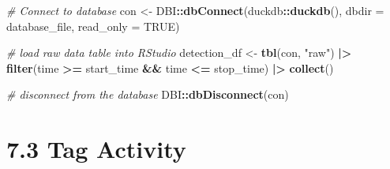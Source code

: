 \documentclass[
]{book}
\newenvironment{Shaded}{\begin{snugshade}}{\end{snugshade}}
\newcommand{\AttributeTok}[1]{\textcolor[rgb]{0.13,0.29,0.53}{#1}}
\newcommand{\CommentTok}[1]{\textcolor[rgb]{0.56,0.35,0.01}{\textit{#1}}}
\newcommand{\ConstantTok}[1]{\textcolor[rgb]{0.56,0.35,0.01}{#1}}
\newcommand{\FunctionTok}[1]{\textcolor[rgb]{0.13,0.29,0.53}{\textbf{#1}}}
\newcommand{\NormalTok}[1]{#1}
\newcommand{\OtherTok}[1]{\textcolor[rgb]{0.56,0.35,0.01}{#1}}
\newcommand{\SpecialCharTok}[1]{\textcolor[rgb]{0.81,0.36,0.00}{\textbf{#1}}}
\newcommand{\StringTok}[1]{\textcolor[rgb]{0.31,0.60,0.02}{#1}}
\begin{document}
\begin{Shaded}
\begin{Highlighting}[]
\CommentTok{\# Connect to database}
\NormalTok{con }\OtherTok{\textless{}{-}}\NormalTok{ DBI}\SpecialCharTok{::}\FunctionTok{dbConnect}\NormalTok{(duckdb}\SpecialCharTok{::}\FunctionTok{duckdb}\NormalTok{(), }
                      \AttributeTok{dbdir =}\NormalTok{ database\_file, }
                      \AttributeTok{read\_only =} \ConstantTok{TRUE}\NormalTok{)}

\CommentTok{\# load raw data table into RStudio}
\NormalTok{detection\_df }\OtherTok{\textless{}{-}} \FunctionTok{tbl}\NormalTok{(con, }\StringTok{"raw"}\NormalTok{) }\SpecialCharTok{|\textgreater{}} 
  \FunctionTok{filter}\NormalTok{(time }\SpecialCharTok{\textgreater{}=}\NormalTok{ start\_time }\SpecialCharTok{\&\&}\NormalTok{ time }\SpecialCharTok{\textless{}=}\NormalTok{ stop\_time) }\SpecialCharTok{|\textgreater{}}
  \FunctionTok{collect}\NormalTok{()}

\CommentTok{\# disconnect from the database}
\NormalTok{DBI}\SpecialCharTok{::}\FunctionTok{dbDisconnect}\NormalTok{(con)}
\end{Highlighting}
\end{Shaded}

\section{7.3 Tag Activity}\label{tag-activity}
\end{document}
